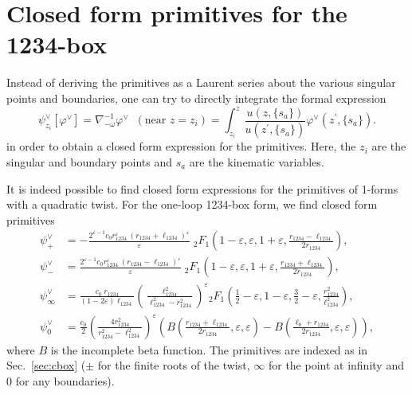 \documentclass[11pt]{article}
\newcommand{\nn}{\nonumber}
\newcommand{\be}{\begin{equation}}
\newcommand{\ee}{\end{equation}}
\newcommand{\vphi}{\varphi}
\newcommand{\vep}{\varepsilon}
\begin{document}
\section{Closed form primitives for the 1234-box \label{app:closed form box prim}}

Instead of deriving the primitives as a Laurent series about the various singular points and boundaries, one can try to directly integrate the formal expression 
\be
	\psi^\vee_{z_i} [\vphi^\vee]
	= \nabla_{-\omega}^{-1} \vphi^\vee \;\; (\text{near } z=z_i)
	= \int_{z_i}^z \frac{u(z,\{s_a\})}{u(z^\prime,\{s_a\})} \vphi^\vee(z^\prime,\{s_a\}).
\ee
in order to obtain a closed form expression for the primitives. Here, the $z_i$ are the singular and boundary points and $s_a$ are the kinematic variables. 

It is indeed possible to find closed form expressions for the primitives of 1-forms with a quadratic twist. For the one-loop 1234-box form, we find closed form primitives
\begin{align}
	\psi^\vee_+ &= -\frac{ 2^{\vep-1} c_0 r_{1234}^{\vep}\ (r_{1234} + \ell_{1234})^{\vep} }{\vep} 
		\;_2F_1 \left( 1-\vep,\vep,1+\vep,\frac{r_{1234}-\ell_{1234}}{2r_{1234}} \right),
\\
	\psi^\vee_- &= \frac{ 2^{\vep-1} c_0 r_{1234}^{\vep}\ (r_{1234} - \ell_{1234})^{\vep} }{\vep} 
		\;_2F_1 \left( 1-\vep,\vep,1+\vep,\frac{r_{1234}+\ell_{1234}}{2r_{1234}} \right),
\\
	\psi^\vee_\infty &= \frac{c_0\ r_{1234} }{(1-2\vep)\ell_{1234}} 
	\left(\frac{\ell_{1234}^2}{\ell_{1234}^2-r_{1234}^2}\right)^{\vep}
	{}_2F_1\left( \frac{1}{2}-\vep, 1-\vep, \frac{3}{2}-\vep, \frac{r_{1234}^2}{\ell_{1234}^2}\right),
\\
	\psi^\vee_0 &= \frac{c_0}{2}
	\left( \frac{4 r_{1234}^2}{r_{1234}^2-\ell_{1234}^2} \right)^\vep
	\left( 
		B\left(\frac{r_{1234}+\ell_{1234}}{2r_{1234}},\vep,\vep\right) 
		- B\left(\frac{ \ell_0 +r_{1234}}{2r_{1234}},\vep,\vep\right) 
	\right),
\end{align}
where $B$ is the incomplete beta function. The primitives are indexed as in Sec.~\ref{sec:cbox} ($\pm$ for the finite roots of the twist, $\infty$ for the point at infinity and $0$ for any boundaries).
\end{document}
